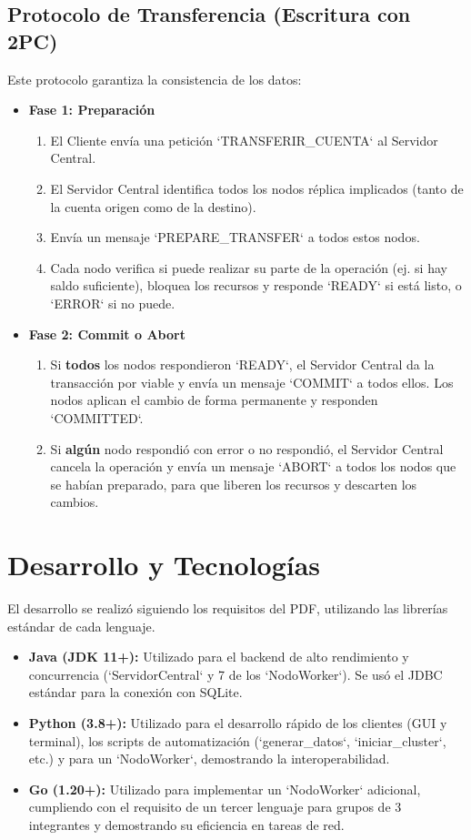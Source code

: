 \documentclass[11pt, a4paper]{article}
\begin{document}
\subsection{Protocolo de Transferencia (Escritura con 2PC)}
Este protocolo garantiza la consistencia de los datos:
\begin{itemize}
    \item \textbf{Fase 1: Preparaci\'{o}n}
    \begin{enumerate}
        \item El Cliente env\'{i}a una petici\'{o}n `TRANSFERIR_CUENTA` al Servidor Central.
        \item El Servidor Central identifica todos los nodos r\'{e}plica implicados (tanto de la cuenta origen como de la destino).
        \item Env\'{i}a un mensaje `PREPARE_TRANSFER` a todos estos nodos.
        \item Cada nodo verifica si puede realizar su parte de la operaci\'{o}n (ej. si hay saldo suficiente), bloquea los recursos y responde `READY` si est\'{a} listo, o `ERROR` si no puede.
    \end{enumerate}
    \item \textbf{Fase 2: Commit o Abort}
    \begin{enumerate}
        \item Si \textbf{todos} los nodos respondieron `READY`, el Servidor Central da la transacci\'{o}n por viable y env\'{i}a un mensaje `COMMIT` a todos ellos. Los nodos aplican el cambio de forma permanente y responden `COMMITTED`.
        \item Si \textbf{alg\'{u}n} nodo respondi\'{o} con error o no respondi\'{o}, el Servidor Central cancela la operaci\'{o}n y env\'{i}a un mensaje `ABORT` a todos los nodos que se hab\'{i}an preparado, para que liberen los recursos y descarten los cambios.
    \end{enumerate}
\end{itemize}

\section{Desarrollo y Tecnolog\'{i}as}
El desarrollo se realiz\'{o} siguiendo los requisitos del PDF, utilizando las librer\'{i}as est\'{a}ndar de cada lenguaje.

\begin{itemize}
    \item \textbf{Java (JDK 11+):} Utilizado para el backend de alto rendimiento y concurrencia (`ServidorCentral` y 7 de los `NodoWorker`). Se us\'{o} el JDBC est\'{a}ndar para la conexi\'{o}n con SQLite.
    \item \textbf{Python (3.8+):} Utilizado para el desarrollo r\'{a}pido de los clientes (GUI y terminal), los scripts de automatizaci\'{o}n (`generar_datos`, `iniciar_cluster`, etc.) y para un `NodoWorker`, demostrando la interoperabilidad.
    \item \textbf{Go (1.20+):} Utilizado para implementar un `NodoWorker` adicional, cumpliendo con el requisito de un tercer lenguaje para grupos de 3 integrantes y demostrando su eficiencia en tareas de red.
\end{itemize}
\end{document}
